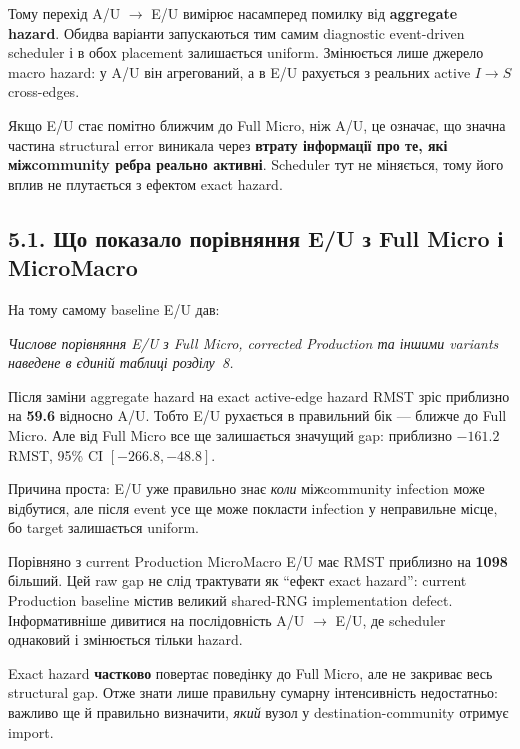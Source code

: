 \documentclass[11pt,a4paper]{article}
\begin{document}
Тому перехід A/U $\to$ E/U вимірює насамперед помилку від \textbf{aggregate hazard}. Обидва варіанти запускаються тим самим diagnostic event-driven scheduler і в обох placement залишається uniform. Змінюється лише джерело macro hazard: у A/U він агрегований, а в E/U рахується з реальних active $I\to S$ cross-edges.

\begin{tcolorbox}[colback=white,colframe=purple,title=Що саме перевіряє E/U?]
Якщо E/U стає помітно ближчим до Full Micro, ніж A/U, це означає, що значна частина structural error виникала через \textbf{втрату інформації про те, які міжcommunity ребра реально активні}. Scheduler тут не міняється, тому його вплив не плутається з ефектом exact hazard.
\end{tcolorbox}

\subsection*{5.1. Що показало порівняння E/U з Full Micro і MicroMacro}

На тому самому baseline E/U дав:

\textit{Числове порівняння E/U з Full Micro, corrected Production та іншими variants наведене в єдиній таблиці розділу~8.}

Після заміни aggregate hazard на exact active-edge hazard RMST зріс приблизно на \textbf{59.6} відносно A/U. Тобто E/U рухається в правильний бік --- ближче до Full Micro. Але від Full Micro все ще залишається значущий gap: приблизно $-161.2$ RMST, 95\% CI $[-266.8,-48.8]$.

Причина проста: E/U уже правильно знає \textit{коли} міжcommunity infection може відбутися, але після event усе ще може покласти infection у неправильне місце, бо target залишається uniform.

Порівняно з current Production MicroMacro E/U має RMST приблизно на \textbf{1098} більший. Цей raw gap не слід трактувати як ``ефект exact hazard'': current Production baseline містив великий shared-RNG implementation defect. Інформативніше дивитися на послідовність A/U $\to$ E/U, де scheduler однаковий і змінюється тільки hazard.

\begin{tcolorbox}[colback=soft,colframe=purple,title=Головний результат E/U]
Exact hazard \textbf{частково} повертає поведінку до Full Micro, але не закриває весь structural gap. Отже знати лише правильну сумарну інтенсивність недостатньо: важливо ще й правильно визначити, \textit{який} вузол у destination-community отримує import.
\end{tcolorbox}
\end{document}

